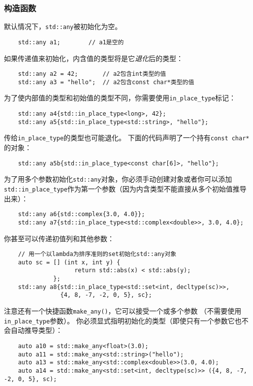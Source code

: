 \subsubsection{构造函数}
默认情况下，\texttt{std::any}被初始化为空。
\begin{lstlisting}
    std::any a1;        // a1是空的
\end{lstlisting}
如果传递值来初始化，内含值的类型将是它\emph{退化}后的类型：
\begin{lstlisting}
    std::any a2 = 42;       // a2包含int类型的值
    std::any a3 = "hello";  // a2包含const char*类型的值
\end{lstlisting}
为了使内部值的类型和初始值的类型不同，你需要使用\texttt{in\_place\_type}标记：
\begin{lstlisting}
    std::any a4{std::in_place_type<long>, 42};
    std::any a5{std::in_place_type<std::string>, "hello"};
\end{lstlisting}
传给\texttt{in\_place\_type}的类型也可能退化。
下面的代码声明了一个持有\texttt{const char*}的对象：
\begin{lstlisting}
    std::any a5b{std::in_place_type<const char[6]>, "hello"};
\end{lstlisting}
为了用多个参数初始化\texttt{std::any}对象，你必须手动创建对象或者你可以添加
\texttt{std::in\_place\_type}作为第一个参数（因为内含类型不能直接从多个初始值推导出来）：
\begin{lstlisting}
    std::any a6{std::complex{3.0, 4.0}};
    std::any a7{std::in_place_type<std::complex<double>>, 3.0, 4.0};
\end{lstlisting}
你甚至可以传递初值列和其他参数：
\begin{lstlisting}
    // 用一个以lambda为排序准则的set初始化std::any对象
    auto sc = [] (int x, int y) {
                    return std::abs(x) < std::abs(y);
              };
    std::any a8{std::in_place_type<std::set<int, decltype(sc)>>,
                {4, 8, -7, -2, 0, 5}, sc};
\end{lstlisting}
注意还有一个快捷函数\texttt{make\_any()}，它可以接受一个或多个参数
（不需要使用\texttt{in\_place\_type}参数）。
你必须显式指明初始化的类型（即使只有一个参数它也不会自动推导类型）：
\begin{lstlisting}
    auto a10 = std::make_any<float>(3.0);
    auto a11 = std::make_any<std::string>("hello");
    auto a13 = std::make_any<std::complex<double>>(3.0, 4.0);
    auto a14 = std::make_any<std::set<int, decltype(sc)>> ({4, 8, -7, -2, 0, 5}, sc);
\end{lstlisting}

